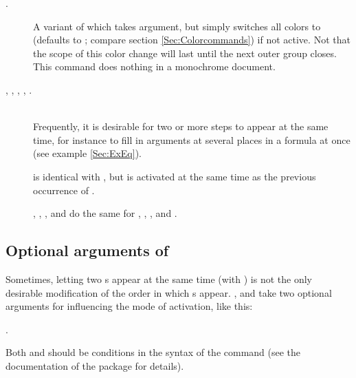 \begin{description}
  \item[.] A variant of  which takes  argument, but simply switches
    all colors to  (defaults to ; compare section \ref{Sec:Colorcommands}) if not
    active. Not that the scope of this color change will last until the next outer group closes. This command does
    nothing in a monochrome document.
    
    \newslide
    
  \item[\small{}, , ,
    , .]\mbox{}\\
    Frequently, it is desirable for two or more steps to appear at the same time, for instance to fill in arguments at
    several places in a formula at once (see example \ref{Sec:ExEq}).
    
     is identical with , but is
    activated at the same time as the previous occurrence of .
    
    , , , and
     do the same for , , , and
    .
  \end{description}

  \newslide

  \subsection{Optional arguments of }%
  Sometimes, letting two s appear at the same time (with ) is not the only desirable
  modification of the order in which s appear. ,  and
   take two optional arguments for influencing the mode of activation, like this:
  \begin{center}
    .
  \end{center}
  Both  and  should be conditions in the syntax of the 
  command (see the documentation of the
  \href{ftp://ftp.dante.de/tex-archive/help/Catalogue/entries/ifthen.html}{} package for details).
  

